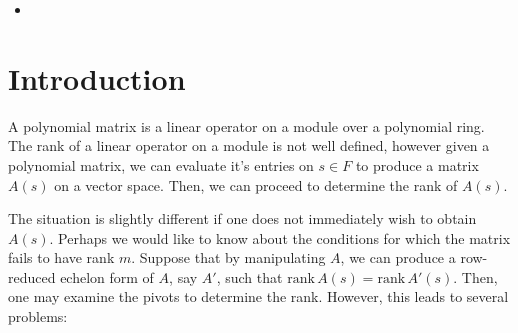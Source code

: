 \documentclass{amsart}
\theoremstyle{definition}
\theoremstyle{remark}
\numberwithin{equation}{section}
\begin{document}
\begin{itemize}
\item {}
\end{itemize}

\newpage

\setcounter{page}{1}

\section{Introduction}

A polynomial matrix is a linear operator on a module over a polynomial ring. The rank of a linear operator on a module is not well defined, however given a polynomial matrix, we can evaluate it's entries on $s \in F$ to produce a matrix $A(s)$ on a vector space. Then, we can proceed to determine the rank of $A(s)$.

The situation is slightly different if one does not immediately wish to obtain $A(s)$. Perhaps we would like to know about the conditions for which the matrix fails to have rank $m$. Suppose that by manipulating $A$, we can produce a row-reduced echelon form of $A$, say $A'$, such that $\mathrm{rank}\,A(s) = \mathrm{rank}\,A'(s)$. Then, one may examine the pivots to determine the rank. However, this leads to several problems:
\end{document}
